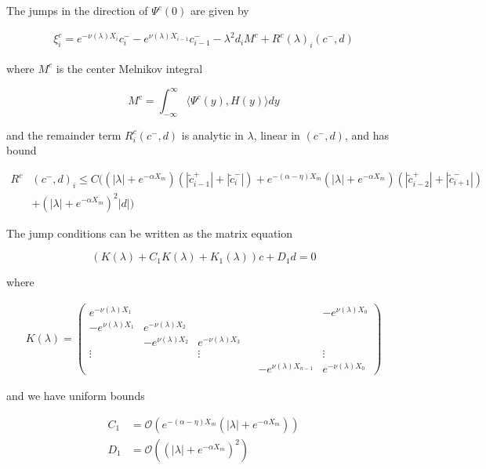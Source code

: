 \documentclass[thesis.tex]{subfiles}
\begin{document}
\begin{lemma}\label{jumpcenteradj}

The jumps in the direction of $\Psi^c(0)$ are given by

\begin{align}\label{xic}
\xi^c_i = e^{-\nu(\lambda) X_i} c_i^- - e^{\nu(\lambda) X_{i-1}} c_{i-1}^- - \lambda^2 d_i M^c + R^c(\lambda)_i(c^-, d)
\end{align}

where $M^c$ is the center Melnikov integral

\begin{equation}\label{Mc}
M^c =  \int_{-\infty}^\infty \langle \Psi^c(y), H(y) \rangle dy 
\end{equation}

and the remainder term $R^c_i(c^-, d)$ is analytic in $\lambda$, linear in $(c^-, d)$, and has bound

\begin{align}\label{Rc}
R^c&(c^-, d)_i \leq C \Big(
(|\lambda| + e^{-\alpha X_m})(|\tilde{c}_{i-1}^+| + |\tilde{c}_{i}^-|) + e^{-(\alpha - \eta) X_m } (|\lambda| + e^{-\alpha X_m})(  |\tilde{c}_{i-2}^+| + |\tilde{c}_{i+1}^-|)  \\
&+ (|\lambda| + e^{-\alpha X_m})^2 |d|
\Big) \nonumber
\end{align}

The jump conditions can be written as the matrix equation

\begin{equation}\label{matrixjumpc}
(K(\lambda) + C_1 K(\lambda) + K_1(\lambda)) c + D_1 d = 0
\end{equation}

where

\begin{align*}
K(\lambda) =  
\begin{pmatrix}
e^{-\nu(\lambda)X_1} & & & & & -e^{\nu(\lambda)X_0} \\
-e^{\nu(\lambda)X_1} & e^{-\nu(\lambda)X_2} \\
& -e^{\nu(\lambda)X_2} & e^{-\nu(\lambda)X_3} \\
\vdots & & \vdots & &&  \vdots \\
& & & & -e^{\nu(\lambda)X_{n-1}} & e^{-\nu(\lambda)X_0} 
\end{pmatrix}
\end{align*}

and we have uniform bounds

\begin{align*}
C_1 &= \mathcal{O}(e^{-(\alpha - \eta) X_m}(|\lambda| + e^{-\alpha X_m})) \\
D_1 &= \mathcal{O}((|\lambda| + e^{-\alpha X_m})^2)
\end{align*}


\end{lemma}
\end{document}
